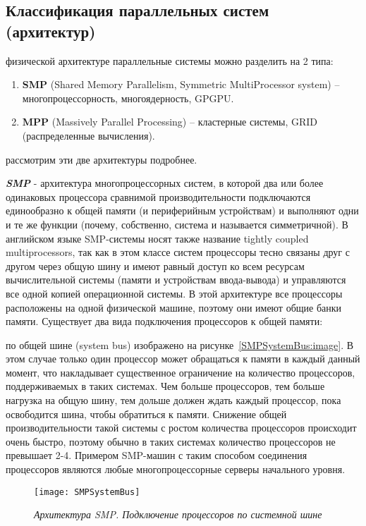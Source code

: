 { %
	\subsection{Классификация параллельных систем (архитектур)}
	 физической архитектуре параллельные системы можно разделить на 2 типа:
		\begin{enumerate}
			\item\textbf{SMP} (Shared Memory Parallelism, Symmetric MultiProcessor system) – многопроцессорность, многоядерность, GPGPU. 
			\item\textbf{MPP} (Massively Parallel Processing) – кластерные системы, GRID (распределенные вычисления).
		\end{enumerate}
	 рассмотрим эти две архитектуры подробнее.
	\par\textbf{\textit{SMP}}  - архитектура многопроцессорных систем, в которой два или более одинаковых процессора сравнимой производительности подключаются единообразно к общей памяти (и периферийным устройствам) и выполняют одни и те же функции (почему, собственно, система и называется симметричной). В английском языке SMP-системы носят также название tightly coupled multiprocessors, так как в этом классе систем процессоры тесно связаны друг с другом через общую шину и имеют равный доступ ко всем ресурсам вычислительной системы (памяти и устройствам ввода-вывода) и управляются все одной копией операционной системы. В этой архитектуре все процессоры расположены на одной физической машине, поэтому они имеют общие банки памяти. Существует два вида подключения процессоров к общей памяти:
		\begin{itemize}
			 по общей шине (system bus) изображено на рисунке~\ref{SMPSystemBus:image}. В этом случае только один процессор может обращаться к памяти в каждый данный момент, что накладывает существенное ограничение на количество процессоров, поддерживаемых в таких системах. Чем больше процессоров, тем больше нагрузка на общую шину, тем дольше должен ждать каждый процессор, пока освободится шина, чтобы обратиться к памяти. Снижение общей производительности такой системы с ростом количества процессоров происходит очень быстро, поэтому обычно в таких системах количество процессоров не превышает 2-4. Примером SMP-машин с таким способом соединения процессоров являются любые многопроцессорные серверы начального уровня.
				\begin{figure}[H]
					\texttt{[image: SMPSystemBus]}
					\caption{\textit{Архитектура SMP. Подключение процессоров по системной шине}}

\end{figure}
\end{itemize}}
